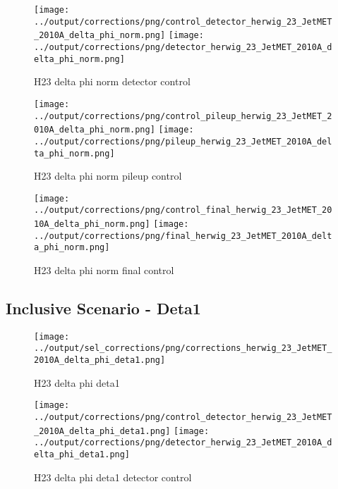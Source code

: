\documentclass[11pt]{book}
\begin{document}
\begin{figure}[ht]
\centering
\texttt{[image: ../output/corrections/png/control\_detector\_herwig\_23\_JetMET\_2010A\_delta\_phi\_norm.png]}
\texttt{[image: ../output/corrections/png/detector\_herwig\_23\_JetMET\_2010A\_delta\_phi\_norm.png]}
\caption{H23 delta phi norm detector control}
\label{fig:H23_JetMET_2010A_delta_phi_norm_detector_control}
\end{figure}

\begin{figure}[ht]
\centering
\texttt{[image: ../output/corrections/png/control\_pileup\_herwig\_23\_JetMET\_2010A\_delta\_phi\_norm.png]}
\texttt{[image: ../output/corrections/png/pileup\_herwig\_23\_JetMET\_2010A\_delta\_phi\_norm.png]}
\caption{H23 delta phi norm pileup control}
\label{fig:H23_JetMET_2010A_delta_phi_norm_pileup_control}
\end{figure}


\begin{figure}[ht]
\centering
\texttt{[image: ../output/corrections/png/control\_final\_herwig\_23\_JetMET\_2010A\_delta\_phi\_norm.png]}
\texttt{[image: ../output/corrections/png/final\_herwig\_23\_JetMET\_2010A\_delta\_phi\_norm.png]}
\caption{H23 delta phi norm final control}
\label{fig:H23_JetMET_2010A_delta_phi_norm_final_control}
\end{figure}

\clearpage
\subsection{Inclusive Scenario - Deta1}

\begin{figure}[ht]
\centering
\texttt{[image: ../output/sel\_corrections/png/corrections\_herwig\_23\_JetMET\_2010A\_delta\_phi\_deta1.png]}
\caption{H23 delta phi deta1}
\label{fig:H23_JetMET_2010A_delta_phi_deta1}
\end{figure}


\begin{figure}[ht]
\centering
\texttt{[image: ../output/corrections/png/control\_detector\_herwig\_23\_JetMET\_2010A\_delta\_phi\_deta1.png]}
\texttt{[image: ../output/corrections/png/detector\_herwig\_23\_JetMET\_2010A\_delta\_phi\_deta1.png]}
\caption{H23 delta phi deta1 detector control}
\label{fig:H23_JetMET_2010A_delta_phi_deta1_detector_control}
\end{figure}
\end{document}
